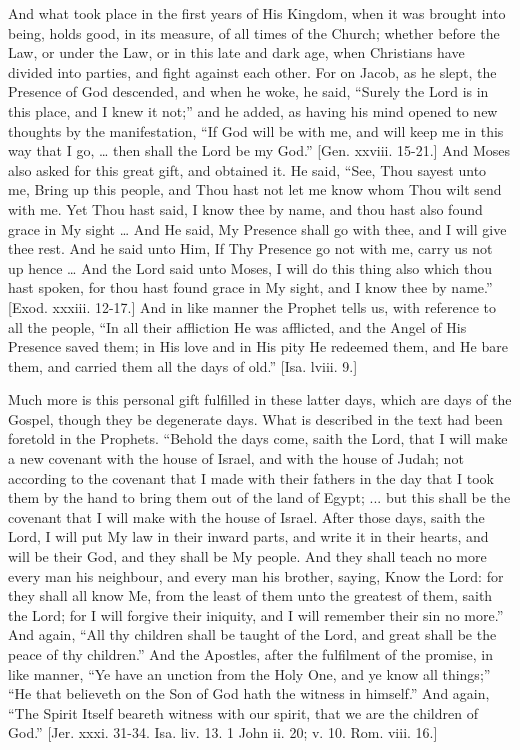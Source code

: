 And what took place in the first years of His Kingdom, when it was
brought into being, holds good, in its measure, of all times of the
Church; whether before the Law, or under the Law, or in this late and
dark age, when Christians have divided into parties, and fight against
each other. For on Jacob, as he slept, the Presence of God descended,
and when he woke, he said, ``Surely the Lord is in this place, and
I knew it not;'' and he added, as having his mind opened to new
thoughts by the manifestation, ``If God will be with me, and will
keep me in this way that I go, … then shall the Lord be my
God.'' [Gen. xxviii. 15-21.] And Moses also asked for this great
gift, and obtained it. He said, ``See, Thou sayest unto me, Bring
up this people, and Thou hast not let me know whom Thou wilt send with
me. Yet Thou hast said, I know thee by name, and thou hast also found
grace in My sight … And He said, My Presence shall go with thee, and
I will give thee rest. And he said unto Him, If Thy Presence go not
with me, carry us not up hence … And the Lord said unto Moses, I
will do this thing also which thou hast spoken, for thou hast found
grace in My sight, and I know thee by name.'' [Exod. xxxiii.
12-17.] And in like manner the Prophet tells us, with reference to all
the people, ``In all their affliction He was afflicted, and the
Angel of His Presence saved them; in His love and in His pity He
redeemed them, and He bare them, and carried them all the days of
old.'' [Isa. lviii. 9.]

Much more is this personal gift fulfilled in these latter days,
which are days of the Gospel, though they be degenerate days. What is
described in the text had been foretold in the Prophets. ``Behold
the days come, saith the Lord, that I will make a new covenant with
the house of Israel, and with the house of Judah; not according to the
covenant that I made with their fathers in the day that I took them by
the hand to bring them out of the land of Egypt; ... but this shall be
the covenant that I will make with the house of Israel. After those
days, saith the Lord, I will put My law in their inward parts, and
write it in their hearts, and will be their God, and they shall be My
people. And they shall teach no more every man his neighbour, and
every man his brother, saying, Know the Lord: for they shall all know
Me, from the least of them unto the greatest of them, saith the Lord;
for I will forgive their iniquity, and I will remember their sin no
more.'' And again, ``All thy children shall be taught of the
Lord, and great shall be the peace of thy children.'' And the
Apostles, after the fulfilment of the promise, in like manner,
``Ye have an unction from the Holy One, and ye know all
things;'' ``He that believeth on the Son of God hath the
witness in himself.'' And again, ``The Spirit Itself beareth
witness with our spirit, that we are the children of God.'' [Jer.
xxxi. 31-34. Isa. liv. 13. 1 John ii. 20; v. 10. Rom. viii. 16.]

